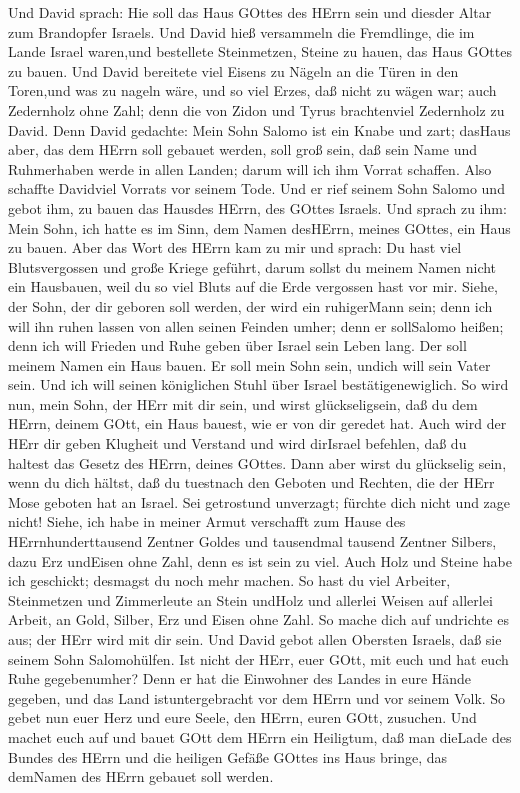  Und David sprach: Hie soll das Haus GOttes des HErrn sein
und diesder Altar zum Brandopfer Israels.  Und David hieß
versammeln die Fremdlinge, die im Lande Israel waren,und bestellete
Steinmetzen, Steine zu hauen, das Haus GOttes zu bauen.  Und
David bereitete viel Eisens zu Nägeln an die Türen in den Toren,und was
zu nageln wäre, und so viel Erzes, daß nicht zu wägen war; 
auch Zedernholz ohne Zahl; denn die von Zidon und Tyrus brachtenviel
Zedernholz zu David.  Denn David gedachte: Mein Sohn Salomo
ist ein Knabe und zart; dasHaus aber, das dem HErrn soll gebauet werden,
soll groß sein, daß sein Name und Ruhmerhaben werde in allen Landen;
darum will ich ihm Vorrat schaffen. Also schaffte Davidviel Vorrats vor
seinem Tode.  Und er rief seinem Sohn Salomo und gebot ihm,
zu bauen das Hausdes HErrn, des GOttes Israels.  Und sprach
zu ihm: Mein Sohn, ich hatte es im Sinn, dem Namen desHErrn, meines
GOttes, ein Haus zu bauen.  Aber das Wort des HErrn kam zu
mir und sprach: Du hast viel Blutsvergossen und große Kriege geführt,
darum sollst du meinem Namen nicht ein Hausbauen, weil du so viel Bluts
auf die Erde vergossen hast vor mir.  Siehe, der Sohn, der
dir geboren soll werden, der wird ein ruhigerMann sein; denn ich will
ihn ruhen lassen von allen seinen Feinden umher; denn er sollSalomo
heißen; denn ich will Frieden und Ruhe geben über Israel sein Leben
lang.  Der soll meinem Namen ein Haus bauen. Er soll mein
Sohn sein, undich will sein Vater sein. Und ich will seinen königlichen
Stuhl über Israel bestätigenewiglich.  So wird nun, mein
Sohn, der HErr mit dir sein, und wirst glückseligsein, daß du dem HErrn,
deinem GOtt, ein Haus bauest, wie er von dir geredet hat. 
Auch wird der HErr dir geben Klugheit und Verstand und wird dirIsrael
befehlen, daß du haltest das Gesetz des HErrn, deines GOttes.
 Dann aber wirst du glückselig sein, wenn du dich hältst,
daß du tuestnach den Geboten und Rechten, die der HErr Mose geboten hat
an Israel. Sei getrostund unverzagt; fürchte dich nicht und zage nicht!
 Siehe, ich habe in meiner Armut verschafft zum Hause des
HErrnhunderttausend Zentner Goldes und tausendmal tausend Zentner
Silbers, dazu Erz undEisen ohne Zahl, denn es ist sein zu viel. Auch
Holz und Steine habe ich geschickt; desmagst du noch mehr machen.
 So hast du viel Arbeiter, Steinmetzen und Zimmerleute an
Stein undHolz und allerlei Weisen auf allerlei Arbeit,  an
Gold, Silber, Erz und Eisen ohne Zahl. So mache dich auf undrichte es
aus; der HErr wird mit dir sein.  Und David gebot allen
Obersten Israels, daß sie seinem Sohn Salomohülfen.  Ist
nicht der HErr, euer GOtt, mit euch und hat euch Ruhe gegebenumher? Denn
er hat die Einwohner des Landes in eure Hände gegeben, und das Land
istuntergebracht vor dem HErrn und vor seinem Volk.  So
gebet nun euer Herz und eure Seele, den HErrn, euren GOtt, zusuchen. Und
machet euch auf und bauet GOtt dem HErrn ein Heiligtum, daß man dieLade
des Bundes des HErrn und die heiligen Gefäße GOttes ins Haus bringe, das
demNamen des HErrn gebauet soll werden.

